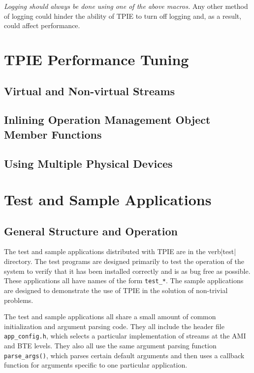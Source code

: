 {\em Logging should always be done using one of the above macros.} Any other method of logging could hinder the ability of TPIE to turn off logging and, as a result, could affect performance.


\chapter{TPIE Performance Tuning}

\section{Virtual and Non-virtual Streams}


\section{Inlining Operation Management Object Member Functions}


\section{Using Multiple Physical Devices}


\chapter{Test and Sample Applications}


\section{General Structure and Operation}

The test and sample applications distributed with TPIE are in the
verb|test| directory.  The test programs are designed primarily to
test the operation of the system to verify that it has been installed
correctly and is as bug free as possible.  These applications all have
names of the form \verb|test_*|.  The sample applications are designed
to demonstrate the use of TPIE in the solution of non-trivial
problems.

The test and sample applications all share a small amount of common
initialization and argument parsing code.  They all include the header
file \verb|app_config.h|, which selects a particular implementation of
streams at the AMI and BTE levels.  They
also all use the same argument parsing function \verb|parse_args()|,
which parses certain default arguments and then uses a callback
function for arguments specific to one particular application.

